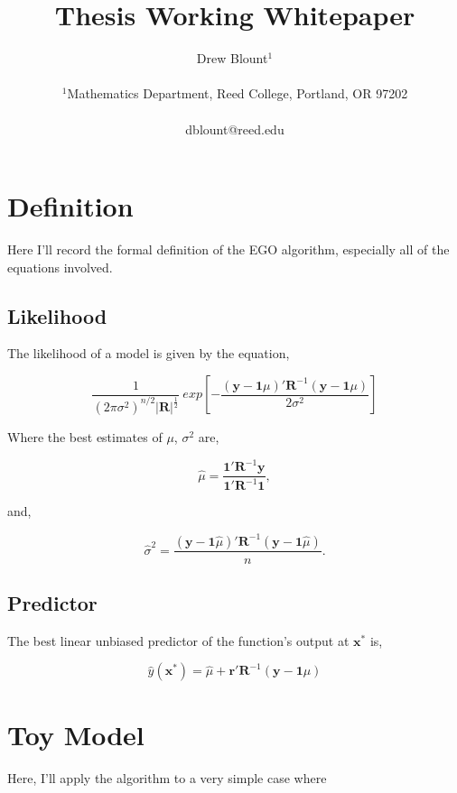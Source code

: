 \documentclass[letterpaper]{article}
\title{Thesis Working Whitepaper}
\author{Drew Blount$^{1}$ \\
\mbox{}\\
$^1$Mathematics Department, Reed College, Portland, OR 97202 \\
\\
dblount@reed.edu}
\newcommand{\mb}{\mathbf}
\begin{document}
\maketitle


\section{Definition}
Here I'll record the formal definition of the EGO algorithm, especially
all of the equations involved.


\subsection{Likelihood}
The likelihood of a model is given by the equation,

\begin{equation} \label{eq:likelihood}
\frac{1}
  {(2\pi\sigma^2)^{n/2}|\mb{R}|^\frac{1}{2}}\ 
exp \left 
  [ -\frac
    {(\mb{y}-\mb{1}\mu)'\mb{R}^{-1}(\mb{y}-\mb{1}\mu)}
    {2\sigma^2} 
\right ]
\end{equation}


Where the best estimates of $\mu$, $\sigma^2$ are,

\begin{equation} \label{eq:mu_hat}
\hat{\mu}=\frac
	{\mb{1}'\mb{R}^{-1}\mb{y}}
	{\mb{1}'\mb{R}^{-1}\mb{1}},
\end{equation}


and,

\begin{equation} \label{eq:mu_hat}
\hat{\sigma}^2=\frac
	{(\mb{y}-\mb{1}\hat{\mu})'\mb{R}^{-1}(\mb{y}-\mb{1}\hat{\mu})}
	{n}.
\end{equation}

\subsection{Predictor}\label{ssec:blup}
The best linear unbiased predictor of the function's output at $\mb{x^*}$ is,


\begin{equation} \label{eq:blup}
\hat{y}(\mb{x^*})=\hat{\mu} + \mb{r}'\mb{R}^{-1}(\mb{y}-\mb{1}\mu)
\end{equation}


\section{Toy Model}
Here, I'll apply the algorithm to a very simple case where
\end{document}
